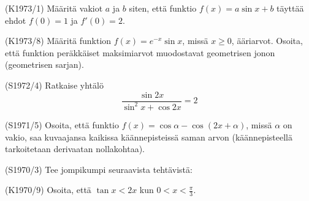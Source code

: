 \begin{tehtava} (K1973/1)
	Määritä vakiot $a$ ja $b$ siten, että funktio $f(x)=a\sin x+b$ täyttää ehdot $f(0)=1$ ja $f'(0)=2$.
\end{tehtava}

\begin{tehtava} (K1973/8)
	Määritä funktion $f(x)=e^{-x}\sin x$, missä $x\geq0$, ääriarvot. Osoita, että funktion peräkkäiset maksimiarvot muodostavat 
	geometrisen jonon (geometrisen sarjan).
\end{tehtava}

\begin{tehtava} (S1972/4)
	Ratkaise yhtälö \[\frac{\sin2x}{\sin^2x+\cos2x}=2\]
\end{tehtava}

\begin{tehtava} (S1971/5)
	Osoita, että funktio $f(x)=\cos\alpha-\cos(2x+\alpha)$, missä $\alpha$ on vakio, saa kuvaajansa kaikissa käännepisteissä 
	saman arvon (käännepisteellä tarkoitetaan derivaatan nollakohtaa).
\end{tehtava}

\begin{tehtava} (S1970/3)
	Tee jompikumpi seuraavista tehtävistä:
		\begin{alakohdat}
		\end{alakohdat}
\end{tehtava}

\begin{tehtava} (K1970/9)
	Osoita, että $\tan x<2x$ kun $0<x<\frac{\pi}{3}$.
\end{tehtava}







